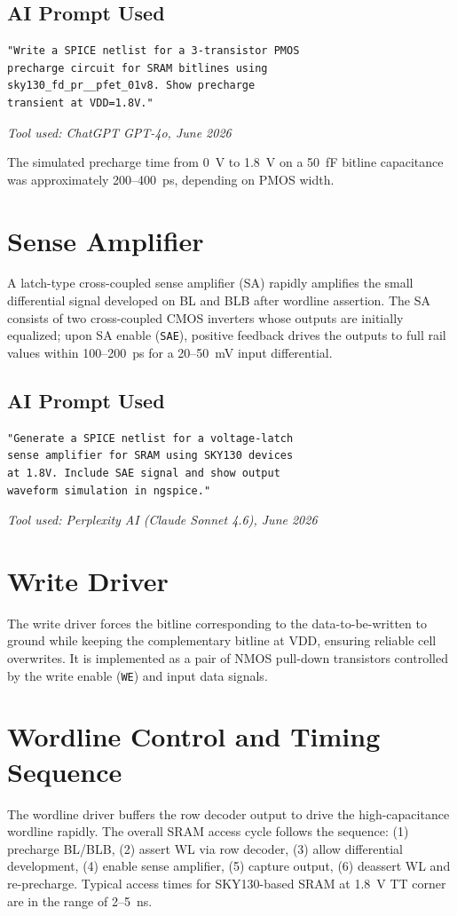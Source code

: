 \documentclass[conference]{IEEEtran}
\begin{document}
\subsection{AI Prompt Used}
\begin{lstlisting}
"Write a SPICE netlist for a 3-transistor PMOS 
precharge circuit for SRAM bitlines using 
sky130_fd_pr__pfet_01v8. Show precharge 
transient at VDD=1.8V."
\end{lstlisting}
\textit{Tool used: ChatGPT GPT-4o, June 2026}

The simulated precharge time from 0~V to 1.8~V on a 50~fF bitline capacitance was approximately 200--400~ps, depending on PMOS width.

\section{Sense Amplifier}
A latch-type cross-coupled sense amplifier (SA) rapidly amplifies the small differential signal developed on BL and BLB after wordline assertion. The SA consists of two cross-coupled CMOS inverters whose outputs are initially equalized; upon SA enable (\texttt{SAE}), positive feedback drives the outputs to full rail values within 100--200~ps for a 20--50~mV input differential.

\subsection{AI Prompt Used}
\begin{lstlisting}
"Generate a SPICE netlist for a voltage-latch 
sense amplifier for SRAM using SKY130 devices 
at 1.8V. Include SAE signal and show output 
waveform simulation in ngspice."
\end{lstlisting}
\textit{Tool used: Perplexity AI (Claude Sonnet 4.6), June 2026}

\section{Write Driver}
The write driver forces the bitline corresponding to the data-to-be-written to ground while keeping the complementary bitline at VDD, ensuring reliable cell overwrites. It is implemented as a pair of NMOS pull-down transistors controlled by the write enable (\texttt{WE}) and input data signals.

\section{Wordline Control and Timing Sequence}
The wordline driver buffers the row decoder output to drive the high-capacitance wordline rapidly. The overall SRAM access cycle follows the sequence: (1) precharge BL/BLB, (2) assert WL via row decoder, (3) allow differential development, (4) enable sense amplifier, (5) capture output, (6) deassert WL and re-precharge. Typical access times for SKY130-based SRAM at 1.8~V TT corner are in the range of 2--5~ns.
\end{document}
